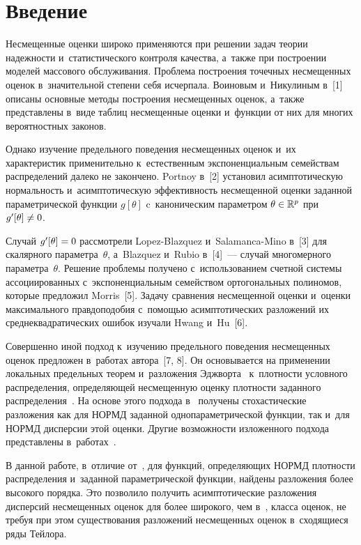 \begin{multicols}{2}

\label{st\stat}

\section{Введение}

  Несмещенные оценки широко применяются при решении задач теории надежности
  и~ста\-ти\-стического контроля качества, а~также при построении моделей массового обслуживания.
  Проб\-ле\-ма построения точечных несмещенных оценок в~значительной степени
 себя исчерпала.  Воиновым и~Никулиным в~[1]
 описаны основные методы построения несмещенных оценок, а~также пред\-став\-ле\-ны
 в~виде таблиц несмещенные оценки и~функции от них для многих вероятностных законов.

  Однако изучение предельного поведения несмещенных оценок и~их характеристик
 применительно к~естественным экспоненциальным семействам распределений
 далеко не закончено.
Portnoy в~[2] установил асимптотическую нормальность и~асимптотическую эффективность несмещенной оценки заданной параметрической
 функции $g[\theta]$ c~каноническим параметром $\theta\hm\in \Rp^p$
 при $g'[\theta]\hm\neq 0$.

  Случай $g'[\theta]\hm=0$ рассмотрели Lopez-Blazquez и~Salamanca-Mino
  в~[3] для скалярного параметра~$\theta$,
 а~Blazquez и~Rubio в~[4]~--- случай многомерного параметра~$\theta.$
%
  Решение проблемы получено с~использованием счетной системы ассоциированных
  с~экспоненциальным семейством ортогональных полиномов, которые предложил
 Morris~[5].
  Задачу сравнения несмещенной оценки и~оценки максимального правдоподобия с~помощью
 асимптотических разложений их среднеквадратических ошибок изучали Hwang
 и~Hu~[6].

  Совершенно иной подход к~изучению предельного поведения несмещенных оценок
 предложен в~работах автора~[7, 8].
  Он основывается на применении локальных предельных теорем и~разложения
  Эджворта~\cite{10-ch, 9-ch} к~плотности условного распределения, определяющей несмещенную оценку плотности
 заданного распределения~\cite{1-ch, 11-ch}.
  На основе этого подхода в~\cite{12-ch} получены стохастические разложения
 как для НОРМД заданной однопа\-ра\-мет\-ри\-че\-ской функции, так 
 и~для НОРМД дисперсии этой оценки. Другие возможности изложенного подхода 
 представлены в~работах~\cite{13-ch, 14-ch}.

  В данной работе, в~отличие от~\cite{12-ch}, для функций, определяющих НОРМД
  плотности распределения и~заданной параметрической функции, найде\-ны
  разложения более высокого порядка. Это позволило получить асимптотические разложения дисперсий несмещенных
 оценок для более широкого, чем в~\cite{6-ch}, класса оценок,
 не требуя при этом существования разложений несмещенных оценок
 в~сходящиеся ряды Тейлора.
 

\end{multicols}
